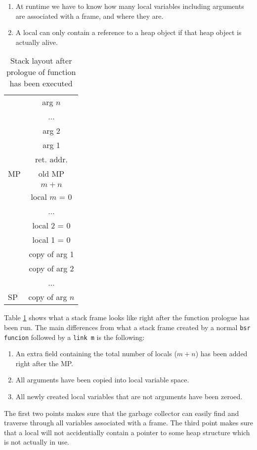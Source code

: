 \documentclass{scrartcl}
\begin{document}
\begin{enumerate}
\item At runtime we have to know how many local variables 
including arguments are 
associated with a frame, and where they are.
\item A local can only contain a reference to a heap object if that
heap object is actually alive.
\end{enumerate}
\begin{table}
\centering
\begin{tabular}{l | c |}
  & arg $n$ \\
\cline{2-2}
  & ... \\
\cline{2-2}
  & arg 2 \\
\cline{2-2}
  & arg 1 \\
\cline{2-2}
  & ret. addr.  \\
\cline{2-2}
MP& old MP \\
\cline{2-2}
  & $m+n$ \\
\cline{2-2}
  & local $m$ = 0 \\
\cline{2-2}
  & ... \\
\cline{2-2}
  & local 2 = 0\\
\cline{2-2}
  & local 1 = 0 \\
\cline{2-2}
  & copy of arg 1 \\
\cline{2-2}
  & copy of arg 2 \\
\cline{2-2}
  & ... \\
\cline{2-2}
SP& copy of arg $n$ 
\end{tabular}
\caption{Stack layout after prologue of function has been executed}
\label{tab:stackframe}
\end{table}
Table \ref{tab:stackframe} shows what a stack frame looks like right
after the function prologue has been run. The main differences from
what a stack frame created by a normal \lstinline{bsr funcion} followed
by a \lstinline{link m} is the following:
\begin{enumerate}
\item An extra field containing the total number of locals ($m+n$)
 has been added right after the MP.
\item All arguments have been copied into local variable space.
\item All newly created local variables that are not arguments have
 been zeroed.
\end{enumerate}
The first two points makes sure that the garbage collector can easily
find and traverse through all variables associated with a frame.
The third point makes sure that a local will not accidentially contain
a pointer to some heap structure which is not actually in use.
\end{document}
